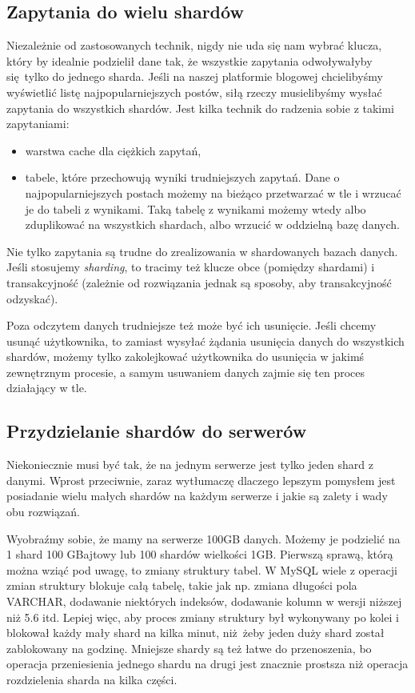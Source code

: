 \documentclass[a4paper,12pt]{article}
\begin{document}
\subsection{Zapytania do wielu shardów}

Niezależnie od zastosowanych technik, nigdy nie uda się nam wybrać klucza, który by idealnie podzielił dane tak, że wszystkie zapytania odwoływałyby się tylko do jednego sharda. Jeśli na naszej platformie blogowej chcielibyśmy wyświetlić listę najpopularniejszych postów, siłą rzeczy musielibyśmy wysłać zapytania do wszystkich shardów. Jest kilka technik do radzenia sobie z takimi zapytaniami:
\begin{itemize}
 \setlength{\itemsep}{0.06cm}
 \setlength{\parskip}{0.06cm}
 \item warstwa cache dla ciężkich zapytań,
 \item tabele, które przechowują wyniki trudniejszych zapytań. Dane o najpopularniejszych postach możemy na bieżąco przetwarzać w tle i wrzucać je do tabeli z wynikami. Taką tabelę z wynikami możemy wtedy albo zduplikować na wszystkich shardach, albo wrzucić w oddzielną bazę danych.
\end{itemize}

Nie tylko zapytania są trudne do zrealizowania w shardowanych bazach danych. Jeśli stosujemy \textit{sharding}, to tracimy też klucze obce (pomiędzy shardami) i transakcyjność (zależnie od rozwiązania jednak są sposoby, aby transakcyjność odzyskać).

Poza odczytem danych trudniejsze też może być ich usunięcie. Jeśli chcemy usunąć użytkownika, to zamiast wysyłać żądania usunięcia danych do wszystkich shardów, możemy tylko zakolejkować użytkownika do usunięcia w jakimś zewnętrznym procesie, a samym usuwaniem danych zajmie się ten proces działający w tle.

\subsection{Przydzielanie shardów do serwerów}

Niekoniecznie musi być tak, że na jednym serwerze jest tylko jeden shard z danymi. Wprost przeciwnie, zaraz wytłumaczę dlaczego lepszym pomysłem jest posiadanie wielu małych shardów na każdym serwerze i jakie są zalety i wady obu rozwiązań.

Wyobraźmy sobie, że mamy na serwerze 100GB danych. Możemy je podzielić na 1 shard 100 GBajtowy lub 100 shardów wielkości 1GB. Pierwszą sprawą, którą można wziąć pod uwagę, to zmiany struktury tabel. W MySQL wiele z operacji zmian struktury blokuje całą tabelę, takie jak np. zmiana długości pola VARCHAR, dodawanie niektórych indeksów, dodawanie kolumn w wersji niższej niż 5.6 itd. Lepiej więc, aby proces zmiany struktury był wykonywany po kolei i blokował każdy mały shard na kilka minut, niż żeby jeden duży shard został zablokowany na godzinę. Mniejsze shardy są też łatwe do przenoszenia, bo operacja przeniesienia jednego shardu na drugi jest znacznie prostsza niż operacja rozdzielenia sharda na kilka części.
\end{document}
